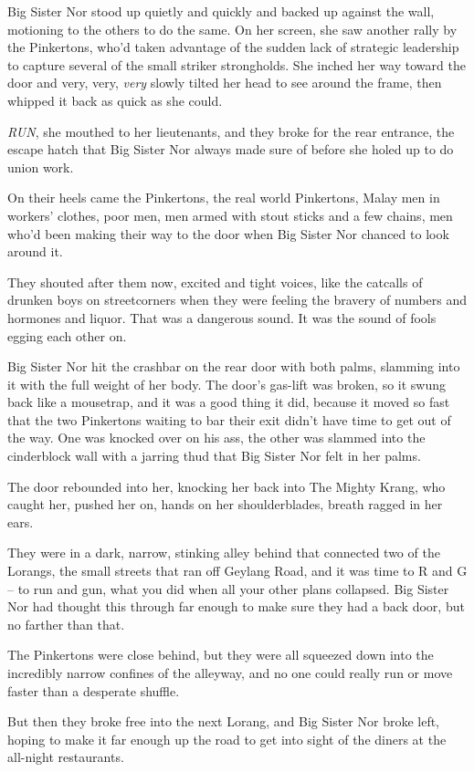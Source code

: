 Big Sister Nor stood up quietly and quickly and backed up against
the wall, motioning to the others to do the same. On her screen,
she saw another rally by the Pinkertons, who'd taken advantage of
the sudden lack of strategic leadership to capture several of the
small striker strongholds. She inched her way toward the door and
very, very, \emph{very} slowly tilted her head to see around the
frame, then whipped it back as quick as she could.

\emph{RUN}, she mouthed to her lieutenants, and they broke for the
rear entrance, the escape hatch that Big Sister Nor always made
sure of before she holed up to do union work.

On their heels came the Pinkertons, the real world Pinkertons,
Malay men in workers' clothes, poor men, men armed with stout
sticks and a few chains, men who'd been making their way to the
door when Big Sister Nor chanced to look around it.

They shouted after them now, excited and tight voices, like the
catcalls of drunken boys on streetcorners when they were feeling
the bravery of numbers and hormones and liquor. That was a
dangerous sound. It was the sound of fools egging each other on.

Big Sister Nor hit the crashbar on the rear door with both palms,
slamming into it with the full weight of her body. The door's
gas-lift was broken, so it swung back like a mousetrap, and it was
a good thing it did, because it moved so fast that the two
Pinkertons waiting to bar their exit didn't have time to get out of
the way. One was knocked over on his ass, the other was slammed
into the cinderblock wall with a jarring thud that Big Sister Nor
felt in her palms.

The door rebounded into her, knocking her back into The Mighty
Krang, who caught her, pushed her on, hands on her shoulderblades,
breath ragged in her ears.

They were in a dark, narrow, stinking alley behind that connected
two of the Lorangs, the small streets that ran off Geylang Road,
and it was time to R and G -- to run and gun, what you did when all
your other plans collapsed. Big Sister Nor had thought this through
far enough to make sure they had a back door, but no farther than
that.

The Pinkertons were close behind, but they were all squeezed down
into the incredibly narrow confines of the alleyway, and no one
could really run or move faster than a desperate shuffle.

But then they broke free into the next Lorang, and Big Sister Nor
broke left, hoping to make it far enough up the road to get into
sight of the diners at the all-night restaurants.

